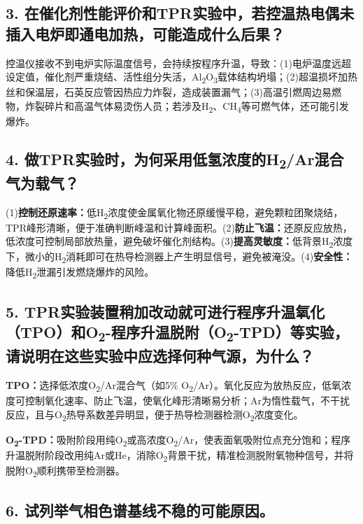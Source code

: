 \documentclass[a4paper]{article}
\begin{document}
\subsection*{3. 在催化剂性能评价和TPR实验中，若控温热电偶未插入电炉即通电加热，可能造成什么后果？}

控温仪接收不到电炉实际温度信号，会持续按程序升温，导致：(1)电炉温度远超设定值，催化剂严重烧结、活性组分失活，Al\textsubscript{2}O\textsubscript{3}载体结构坍塌；(2)超温损坏加热丝和保温层，石英反应管因热应力炸裂，造成装置漏气；(3)高温引燃周边易燃物，炸裂碎片和高温气体易烫伤人员；若涉及H\textsubscript{2}、CH\textsubscript{4}等可燃气体，还可能引发爆炸。

\subsection*{4. 做TPR实验时，为何采用低氢浓度的H\textsubscript{2}/Ar混合气为载气？}

(1)\textbf{控制还原速率：}低H\textsubscript{2}浓度使金属氧化物还原缓慢平稳，避免颗粒团聚烧结，TPR峰形清晰，便于准确判断峰温和计算峰面积。(2)\textbf{防止飞温：}还原反应放热，低浓度可控制局部放热量，避免破坏催化剂结构。(3)\textbf{提高灵敏度：}低背景H\textsubscript{2}浓度下，微小的H\textsubscript{2}消耗即可在热导检测器上产生明显信号，避免被淹没。(4)\textbf{安全性：}降低H\textsubscript{2}泄漏引发燃烧爆炸的风险。

\subsection*{5. TPR实验装置稍加改动就可进行程序升温氧化（TPO）和O\textsubscript{2}-程序升温脱附（O\textsubscript{2}-TPD）等实验，请说明在这些实验中应选择何种气源，为什么？}

\textbf{TPO：}选择低浓度O\textsubscript{2}/Ar混合气（如5\% O\textsubscript{2}/Ar）。氧化反应为放热反应，低氧浓度可控制氧化速率、防止飞温，使氧化峰形清晰易分析；Ar为惰性载气，不干扰反应，且与O\textsubscript{2}热导系数差异明显，便于热导检测器检测O\textsubscript{2}浓度变化。

\textbf{O\textsubscript{2}-TPD：}吸附阶段用纯O\textsubscript{2}或高浓度O\textsubscript{2}/Ar，使表面氧吸附位点充分饱和；程序升温脱附阶段改用纯Ar或He，消除O\textsubscript{2}背景干扰，精准检测脱附氧物种信号，并将脱附O\textsubscript{2}顺利携带至检测器。

\subsection*{6. 试列举气相色谱基线不稳的可能原因。}
\end{document}

